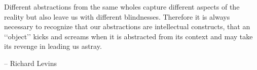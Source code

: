 
\thispagestyle{empty}

\vspace*{3cm}

\begin{center}
\flushleft
Different abstractions from the same wholes capture different aspects of the reality but also leave us with different blindnesses. Therefore it is always necessary to recognize that our abstractions are intellectual constructs, that an ‘‘object’’ kicks and screams when it is abstracted from its context and may take its revenge in leading us astray.

	\flushright -- Richard Levins 
\end{center}

\medskip
